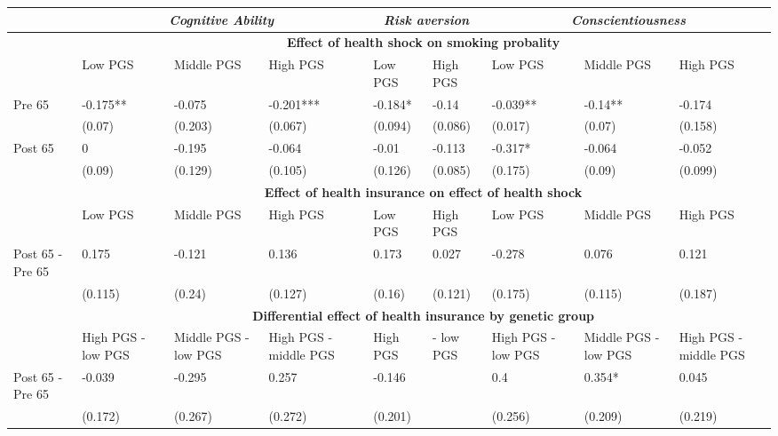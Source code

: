 % 
\begin{tabular}{l| p{2.5cm}p{2.5cm}p{2.5cm}| p{2.5cm}p{2.5cm}| p{2.5cm}p{2.5cm}p{2.5cm}}
  & \multicolumn{3}{c}{ \textit{Cognitive Ability}} &  \multicolumn{2}{c}{ \textit{Risk aversion}} &  \multicolumn{3}{c}{ \textit{Conscientiousness}}  \\
 \toprule
  & \multicolumn{8}{c}{\textbf{Effect of health shock on smoking probality}} \\
 \midrule
 & Low PGS & Middle PGS & High PGS & Low PGS & High PGS & Low PGS & Middle PGS & High PGS \\ 
   \midrule
Pre 65 & -0.175** & -0.075 & -0.201*** & -0.184* & -0.14 & -0.039** & -0.14** & -0.174 \\ 
   & (0.07) & (0.203) & (0.067) & (0.094) & (0.086) & (0.017) & (0.07) & (0.158) \\ 
  Post 65 & 0 & -0.195 & -0.064 & -0.01 & -0.113 & -0.317* & -0.064 & -0.052 \\ 
   & (0.09) & (0.129) & (0.105) & (0.126) & (0.085) & (0.175) & (0.09) & (0.099) \\ 
   \toprule & \multicolumn{8}{c}{ \textbf{Effect of health insurance on effect of health shock}} \\
 \midrule
 & Low PGS & Middle PGS & High PGS & Low PGS & High PGS & Low PGS & Middle PGS & High PGS \\ 
   \midrule
Post 65 - Pre 65 & 0.175 & -0.121 & 0.136 & 0.173 & 0.027 & -0.278 & 0.076 & 0.121 \\ 
   & (0.115) & (0.24) & (0.127) & (0.16) & (0.121) & (0.175) & (0.115) & (0.187) \\ 
   \toprule & \multicolumn{8}{c}{ \textbf{Differential effect of health insurance by genetic group}} \\
 \midrule
 & High PGS - low PGS & Middle PGS - low PGS & High PGS - middle PGS & High PGS  & - low PGS & High PGS - low PGS & Middle PGS - low PGS & High PGS - middle PGS \\ 
   \midrule
Post 65 - Pre 65 & -0.039 & -0.295 & 0.257 & -0.146 &  & 0.4 & 0.354* & 0.045 \\ 
   & (0.172) & (0.267) & (0.272) & (0.201) &  & (0.256) & (0.209) & (0.219) \\ 
  \end{tabular}
